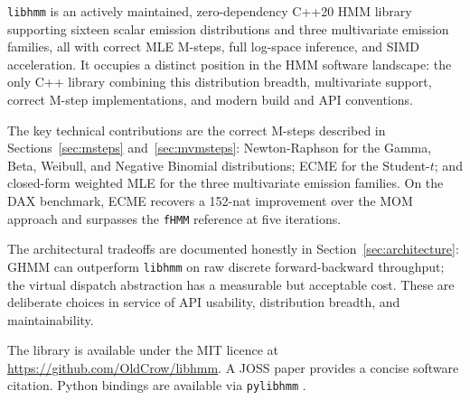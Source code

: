 \documentclass[11pt]{article}
\begin{document}
\texttt{libhmm} is an actively maintained, zero-dependency C++20 HMM library
supporting sixteen scalar emission distributions and three multivariate
emission families, all with correct MLE M-steps, full log-space inference,
and SIMD acceleration.
It occupies a distinct position in the HMM software landscape:
the only C++ library combining this distribution breadth, multivariate
support, correct M-step implementations, and modern build and API conventions.

The key technical contributions are the correct M-steps described in
Sections~\ref{sec:msteps} and~\ref{sec:mvmsteps}: Newton-Raphson for the
Gamma, Beta, Weibull, and Negative Binomial distributions; ECME for the
Student-$t$; and closed-form weighted MLE for the three multivariate
emission families.
On the DAX benchmark, ECME recovers a 152-nat improvement over the MOM
approach and surpasses the \texttt{fHMM} reference at five iterations.

The architectural tradeoffs are documented honestly in
Section~\ref{sec:architecture}: GHMM can outperform \texttt{libhmm} on raw
discrete forward-backward throughput; the virtual dispatch abstraction has
a measurable but acceptable cost.
These are deliberate choices in service of API usability, distribution
breadth, and maintainability.

The library is available under the MIT licence at
\url{https://github.com/OldCrow/libhmm}.
A JOSS paper \citep{libhmm_joss} provides a concise software citation.
Python bindings are available via \texttt{pylibhmm} \citep{pylibhmm}.



\end{document}
